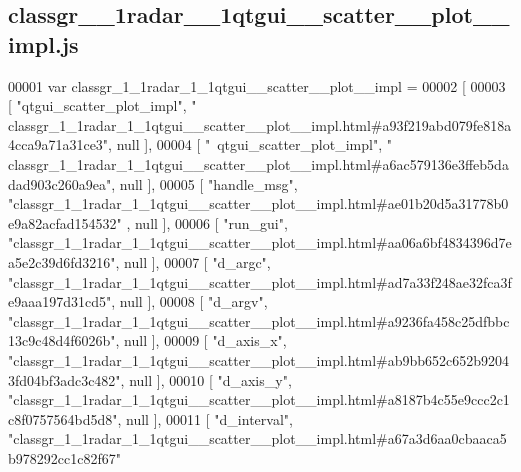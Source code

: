 \subsection{classgr\+\_\+\_\+1radar\+\_\+\_\+1qtgui\+\_\+\+\_\+scatter\+\_\+\+\_\+plot\+\_\+\+\_\+impl.\+js}
\label{classgr__1__1radar__1__1qtgui____scatter____plot____impl_8js_source}

\begin{DoxyCode}
00001 var classgr_1_1radar_1_1qtgui__scatter__plot__impl =
00002 [
00003     [ \textcolor{stringliteral}{"qtgui\_scatter\_plot\_impl"}, \textcolor{stringliteral}{"
      classgr\_1\_1radar\_1\_1qtgui\_\_scatter\_\_plot\_\_impl.html#a93f219abd079fe818a4cca9a71a31ce3"}, null ],
00004     [ \textcolor{stringliteral}{"~qtgui\_scatter\_plot\_impl"}, \textcolor{stringliteral}{"
      classgr\_1\_1radar\_1\_1qtgui\_\_scatter\_\_plot\_\_impl.html#a6ac579136e3ffeb5dadad903c260a9ea"}, null ],
00005     [ \textcolor{stringliteral}{"handle\_msg"}, \textcolor{stringliteral}{"classgr\_1\_1radar\_1\_1qtgui\_\_scatter\_\_plot\_\_impl.html#ae01b20d5a31778b0e9a82acfad154532"}
      , null ],
00006     [ \textcolor{stringliteral}{"run\_gui"}, \textcolor{stringliteral}{"classgr\_1\_1radar\_1\_1qtgui\_\_scatter\_\_plot\_\_impl.html#aa06a6bf4834396d7ea5e2c39d6fd3216"}, 
      null ],
00007     [ \textcolor{stringliteral}{"d\_argc"}, \textcolor{stringliteral}{"classgr\_1\_1radar\_1\_1qtgui\_\_scatter\_\_plot\_\_impl.html#ad7a33f248ae32fca3fe9aaa197d31cd5"}, 
      null ],
00008     [ \textcolor{stringliteral}{"d\_argv"}, \textcolor{stringliteral}{"classgr\_1\_1radar\_1\_1qtgui\_\_scatter\_\_plot\_\_impl.html#a9236fa458c25dfbbc13c9c48d4f6026b"}, 
      null ],
00009     [ \textcolor{stringliteral}{"d\_axis\_x"}, \textcolor{stringliteral}{"classgr\_1\_1radar\_1\_1qtgui\_\_scatter\_\_plot\_\_impl.html#ab9bb652c652b92043fd04bf3adc3c482"}, 
      null ],
00010     [ \textcolor{stringliteral}{"d\_axis\_y"}, \textcolor{stringliteral}{"classgr\_1\_1radar\_1\_1qtgui\_\_scatter\_\_plot\_\_impl.html#a8187b4c55e9ccc2c1c8f0757564bd5d8"}, 
      null ],
00011     [ \textcolor{stringliteral}{"d\_interval"}, \textcolor{stringliteral}{"classgr\_1\_1radar\_1\_1qtgui\_\_scatter\_\_plot\_\_impl.html#a67a3d6aa0cbaaca5b978292cc1c82f67"}

\end{DoxyCode}
